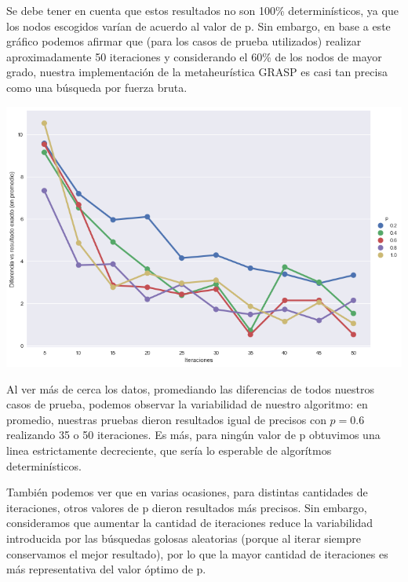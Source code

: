 Se debe tener en cuenta que estos resultados no son 100\% determinísticos, ya que los nodos escogidos varían de acuerdo al valor de p. Sin embargo, en base a este gráfico podemos afirmar que (para los casos de prueba utilizados) realizar aproximadamente 50 iteraciones y considerando el 60\% de los nodos de mayor grado, nuestra implementación de la metaheurística GRASP es casi tan precisa como una búsqueda por fuerza bruta.

\begin{center}
    \includegraphics[scale=0.6]{img/grasp-it-v-p.png}
\end{center}

Al ver más de cerca los datos, promediando las diferencias de todos nuestros casos de prueba, podemos observar la variabilidad de nuestro algoritmo: en promedio, nuestras pruebas dieron resultados igual de precisos con $p = 0.6$ realizando 35 o 50 iteraciones. Es más, para ningún valor de p obtuvimos una linea estrictamente decreciente, que sería lo esperable de algorítmos determinísticos.

También podemos ver que en varias ocasiones, para distintas cantidades de iteraciones, otros valores de p dieron resultados más precisos. Sin embargo, consideramos que aumentar la cantidad de iteraciones reduce la variabilidad introducida por las búsquedas golosas aleatorias (porque al iterar siempre conservamos el mejor resultado), por lo que la mayor cantidad de iteraciones es más representativa del valor óptimo de p.
